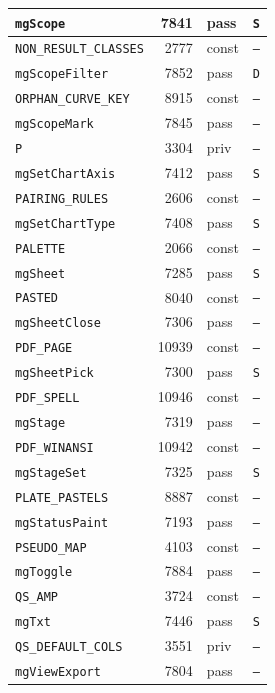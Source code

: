 {\begin{xltabular}{\linewidth}{|l|r|X|X|}
\texttt{mgScope} & 7841 & pass & \texttt{S} \\ \hline
\texttt{NON\_RESULT\_CLASSES} & 2777 & const & \texttt{--} \\ \hline
\texttt{mgScopeFilter} & 7852 & pass & \texttt{D} \\ \hline
\texttt{ORPHAN\_CURVE\_KEY} & 8915 & const & \texttt{--} \\ \hline
\texttt{mgScopeMark} & 7845 & pass & \texttt{--} \\ \hline
\texttt{P} & 3304 & priv & \texttt{--} \\ \hline
\texttt{mgSetChartAxis} & 7412 & pass & \texttt{S} \\ \hline
\texttt{PAIRING\_RULES} & 2606 & const & \texttt{--} \\ \hline
\texttt{mgSetChartType} & 7408 & pass & \texttt{S} \\ \hline
\texttt{PALETTE} & 2066 & const & \texttt{--} \\ \hline
\texttt{mgSheet} & 7285 & pass & \texttt{S} \\ \hline
\texttt{PASTED} & 8040 & const & \texttt{--} \\ \hline
\texttt{mgSheetClose} & 7306 & pass & \texttt{--} \\ \hline
\texttt{PDF\_PAGE} & 10939 & const & \texttt{--} \\ \hline
\texttt{mgSheetPick} & 7300 & pass & \texttt{S} \\ \hline
\texttt{PDF\_SPELL} & 10946 & const & \texttt{--} \\ \hline
\texttt{mgStage} & 7319 & pass & \texttt{--} \\ \hline
\texttt{PDF\_WINANSI} & 10942 & const & \texttt{--} \\ \hline
\texttt{mgStageSet} & 7325 & pass & \texttt{S} \\ \hline
\texttt{PLATE\_PASTELS} & 8887 & const & \texttt{--} \\ \hline
\texttt{mgStatusPaint} & 7193 & pass & \texttt{--} \\ \hline
\texttt{PSEUDO\_MAP} & 4103 & const & \texttt{--} \\ \hline
\texttt{mgToggle} & 7884 & pass & \texttt{--} \\ \hline
\texttt{QS\_AMP} & 3724 & const & \texttt{--} \\ \hline
\texttt{mgTxt} & 7446 & pass & \texttt{S} \\ \hline
\texttt{QS\_DEFAULT\_COLS} & 3551 & priv & \texttt{--} \\ \hline
\texttt{mgViewExport} & 7804 & pass & \texttt{--} \\ \hline

\end{xltabular}}
